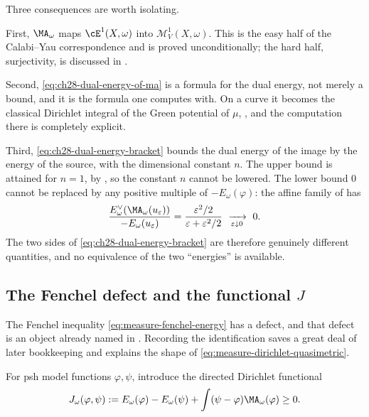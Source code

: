 \begin{remark}
\label{rem:ch28-reading-dual-of-ma}
Three consequences are worth isolating.

First, $\MA_\omega$ maps $\cE^1(X,\omega)$ into
$\mathcal M^1_V(X,\omega)$.  This is the easy half of the Calabi--Yau
correspondence and is proved unconditionally; the hard half, surjectivity,
is discussed in .

Second, \eqref{eq:ch28-dual-energy-of-ma} is a formula for the dual energy,
not merely a bound, and it is the formula one computes with.  On a curve it
becomes the classical Dirichlet integral of the Green potential of $\mu$,
, and the computation there is completely
explicit.

Third, \eqref{eq:ch28-dual-energy-bracket} bounds the dual energy of the
image by the energy of the source, with the dimensional constant $n$.  The
upper bound is attained for $n=1$, by
, so the constant $n$ cannot be
lowered.  The lower bound $0$ cannot be replaced by any positive multiple
of $-E_\omega(\varphi)$: the affine family of
 has
\[
 \frac{E^\vee_\omega(\MA_\omega(u_\varepsilon))}
      {-E_\omega(u_\varepsilon)}
 =\frac{\varepsilon^2/2}{\varepsilon+\varepsilon^2/2}
 \ \xrightarrow[\varepsilon\downarrow0]{}\ 0 .
\]
The two sides of \eqref{eq:ch28-dual-energy-bracket} are therefore genuinely
different quantities, and no equivalence of the two ``energies'' is
available.
\end{remark}

\subsection{The Fenchel defect and the functional \texorpdfstring{$J$}{J}}
\label{sec:ch28-fenchel-defect}

The Fenchel inequality \eqref{eq:measure-fenchel-energy} has a defect, and
that defect is an object already named in .  Recording
the identification saves a great deal of later bookkeeping and explains the
shape of \eqref{eq:measure-dirichlet-quasimetric}.

For psh model functions $\varphi,\psi$, introduce the directed Dirichlet
functional
\begin{equation}
\label{eq:directed-dirichlet-functional}
 J_\omega(\varphi,\psi)
 :=E_\omega(\varphi)-E_\omega(\psi)
   +\int(\psi-\varphi)\MA_\omega(\varphi)\geq0.
\end{equation}

